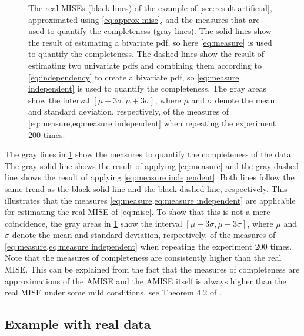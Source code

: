 \setlength\figurewidth{\linewidth}
\setlength{}
\begin{figure}
	\centering
	
	\caption{The real MISEs (black lines) of the example of \cref{sec:result artificial}, approximated using \cref{eq:approx mise}, and the measures that are used to quantify the completeness (gray lines). The solid lines show the result of estimating a bivariate pdf, so here \cref{eq:measure} is used to quantify the completeness. The dashed lines show the result of estimating two univariate pdfs and combining them according to \cref{eq:independency} to create a bivariate pdf, so \cref{eq:measure independent} is used to quantify the completeness. The gray areas show the interval $[\mu-3\sigma,\mu+3\sigma]$, where $\mu$ and $\sigma$ denote the mean and standard deviation, respectively, of the measures of \cref{eq:measure,eq:measure independent} when repeating the experiment 200 times.} 
	\label{fig:mise example}
\end{figure}

The gray lines in \cref{fig:mise example} show the measures to quantify the completeness of the data. The gray solid line shows the result of applying \cref{eq:measure} and the gray dashed line shows the result of applying \cref{eq:measure independent}. Both lines follow the same trend as the black solid line and the black dashed line, respectively. This illustrates that the measures \cref{eq:measure,eq:measure independent} are applicable for estimating the real MISE of \cref{eq:mise}. To show that this is not a mere coincidence, the gray areas in \cref{fig:mise example} show the interval $[\mu-3\sigma,\mu+3\sigma]$, where $\mu$ and $\sigma$ denote the mean and standard deviation, respectively, of the measures of \cref{eq:measure,eq:measure independent} when repeating the experiment 200 times. Note that the measures of completeness are consistently higher than the real MISE. This can be explained from the fact that the measures of completeness are approximations of the AMISE and the AMISE itself is always higher than the real MISE under some mild conditions, see Theorem 4.2 of \textcite{marron1992exact}.

\subsection{Example with real data}
\label{sec:result real}

